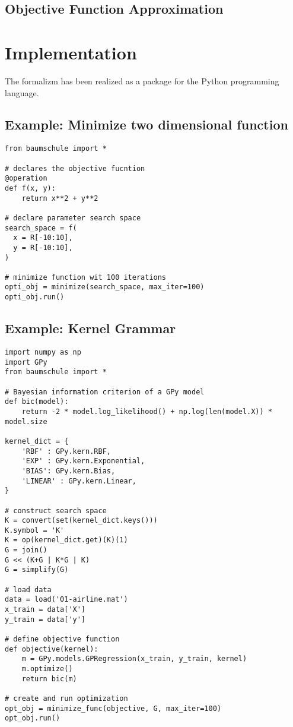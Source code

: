 \documentclass[english]{article}
\begin{document}
\subsection{Objective Function Approximation}


\section{Implementation}
The formalizm has been realized as a package for the Python programming language.

\subsection{Example: Minimize two dimensional function}

\begin{verbatim}
from baumschule import *

# declares the objective fucntion
@operation
def f(x, y):
    return x**2 + y**2

# declare parameter search space
search_space = f(
  x = R[-10:10],
  y = R[-10:10],
)

# minimize function wit 100 iterations
opti_obj = minimize(search_space, max_iter=100)
opti_obj.run()

\end{verbatim}

\subsection{Example: Kernel Grammar}

\begin{verbatim}
import numpy as np
import GPy
from baumschule import *

# Bayesian information criterion of a GPy model
def bic(model):
    return -2 * model.log_likelihood() + np.log(len(model.X)) * model.size

kernel_dict = {
    'RBF' : GPy.kern.RBF,
    'EXP' : GPy.kern.Exponential,
    'BIAS': GPy.kern.Bias,
    'LINEAR' : GPy.kern.Linear,
}

# construct search space
K = convert(set(kernel_dict.keys()))
K.symbol = 'K'
K = op(kernel_dict.get)(K)(1)
G = join()
G << (K+G | K*G | K)
G = simplify(G)

# load data
data = load('01-airline.mat')
x_train = data['X']
y_train = data['y']

# define objective function
def objective(kernel):
    m = GPy.models.GPRegression(x_train, y_train, kernel)
    m.optimize()
    return bic(m)

# create and run optimization
opt_obj = minimize_func(objective, G, max_iter=100)
opt_obj.run()

\end{verbatim}
\end{document}
